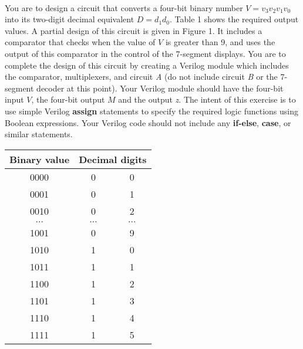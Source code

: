 \documentclass[psfig,10pt,fullpage]{article}
\begin{document}
~\\
You are to design a circuit that converts a four-bit binary number $V = v_3 v_2 v_1 v_0$
into its two-digit decimal equivalent $D = d_1 d_0$. Table 1 shows the required output
values. A partial design of this circuit is given in Figure 1. It includes a comparator
that checks when the value of $V$ is greater than 9, and uses the output of this
comparator in the control of the 7-segment displays. You are to complete the design of
this circuit by creating a Verilog module which includes the comparator, multiplexers,
and circuit {\it A} (do not include circuit {\it B} or the 7-segment decoder at this
point). Your Verilog module should have the four-bit input $V$, the four-bit output $M$ and
the output {\it z}. The intent of this exercise is to use simple Verilog {\bf assign}
statements to specify the required logic functions using Boolean
expressions. Your Verilog code should not include any {\bf if-else}, {\bf case}, or
similar statements. 

\begin{center}
\begin{tabular}{c|c c}
Binary value & \multicolumn{2}{c}{Decimal digits}\\ \hline
\hspace{0.75 mm} {\rule[0mm]{0mm}{5mm}0000} & 0 & 0\\ 
\hspace{0.75 mm} 0001 & 0 & 1\\
\hspace{0.75 mm} 0010 & 0 & 2\\
\hspace{0.75 mm} {\rule[0mm]{0mm}{2.5mm}$\ldots$} & $\ldots$ & $\ldots$ \\
\hspace{0.75 mm} {\rule[0mm]{0mm}{5mm}1001} & 0 & 9\\
\hspace{0.75 mm} 1010 & 1 & 0\\
\hspace{0.75 mm} 1011 & 1 & 1\\
\hspace{0.75 mm} 1100 & 1 & 2\\
\hspace{0.75 mm} 1101 & 1 & 3\\
\hspace{0.75 mm} 1110 & 1 & 4\\
\hspace{0.75 mm} 1111 & 1 & 5\\
\end{tabular}
\end{center}
\end{document}
